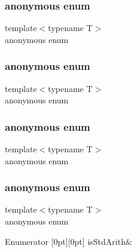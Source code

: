 \mbox{\label{classUtil_1_1TypeTraits_a9378bcbd1bfb5da7bd81aa564423924a}} 
\subsubsection{\texorpdfstring{anonymous enum}{anonymous enum}}
{\footnotesize\ttfamily template$<$typename T$>$ \\
anonymous enum}

\mbox{\label{classUtil_1_1TypeTraits_a3d9fa2a052e3e731586d1a714de17d6c}} 
\subsubsection{\texorpdfstring{anonymous enum}{anonymous enum}}
{\footnotesize\ttfamily template$<$typename T$>$ \\
anonymous enum}

\mbox{\label{classUtil_1_1TypeTraits_ac84adcf827783dd2ae3abca0f67641f4}} 
\subsubsection{\texorpdfstring{anonymous enum}{anonymous enum}}
{\footnotesize\ttfamily template$<$typename T$>$ \\
anonymous enum}

\mbox{\label{classUtil_1_1TypeTraits_abfcd1f4b7a5011b6ea8b965d1b46e54e}} 
\subsubsection{\texorpdfstring{anonymous enum}{anonymous enum}}
{\footnotesize\ttfamily template$<$typename T$>$ \\
anonymous enum}

\begin{DoxyEnumFields}{Enumerator}
[0pt][0pt]{}\mbox{\label{classUtil_1_1TypeTraits_a1cfd1423cce5a0b762ee8f5c9c2f004ea3017f19abc6084d7e144891aaf5adb0f}} 
is\+Std\+Arith&\\
\hline

\end{DoxyEnumFields}
\mbox{\label{classUtil_1_1TypeTraits_ae92d99a34daca0ca219bbab6663bb6be}} 
